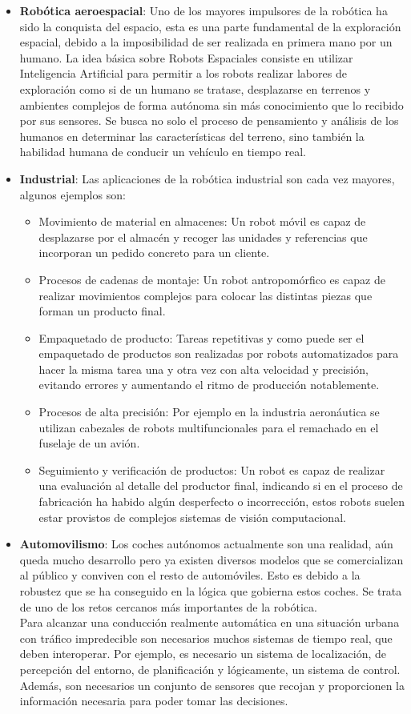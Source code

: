 \begin{itemize}
\item \textbf{Robótica aeroespacial}: Uno de los mayores impulsores de la robótica ha sido la conquista del espacio, esta es una parte fundamental de la exploración espacial, debido a la imposibilidad de ser realizada en primera mano por un humano.
La idea básica sobre Robots Espaciales consiste en utilizar Inteligencia Artificial para
permitir a los robots realizar labores de exploración como si de un humano se tratase, desplazarse en terrenos y ambientes complejos de forma autónoma sin más conocimiento que lo recibido por sus sensores. Se busca no solo el proceso de pensamiento y análisis de los humanos en determinar las características del terreno, sino también la habilidad humana de conducir un vehículo en tiempo real.
\item \textbf{Industrial}: Las aplicaciones de la robótica industrial son cada vez mayores, algunos ejemplos son:
\begin{itemize}
\item Movimiento de material en almacenes: Un robot móvil es capaz de desplazarse por el almacén y recoger las unidades y referencias que incorporan un pedido concreto para un cliente.
\item Procesos de cadenas de montaje: Un robot antropomórfico es capaz de realizar movimientos complejos para colocar las distintas piezas que forman un producto final.
\item Empaquetado de producto: Tareas repetitivas y como puede ser el empaquetado de productos son realizadas por robots automatizados para hacer la misma tarea una y otra vez con alta velocidad y precisión, evitando errores y aumentando el ritmo de producción notablemente.
\item Procesos de alta precisión: Por ejemplo en la industria aeronáutica se utilizan cabezales de robots multifuncionales para el remachado en el fuselaje de un avión.
\item Seguimiento y verificación de productos: Un robot es capaz de realizar una evaluación al detalle del productor final, indicando si en el proceso de fabricación ha habido algún desperfecto o incorrección, estos robots suelen estar provistos de complejos sistemas de visión computacional.
\end{itemize}

\item \textbf{Automovilismo}: Los coches autónomos actualmente son una realidad, aún queda mucho desarrollo pero ya existen diversos modelos que se comercializan al público y conviven con el resto de automóviles. Esto es debido a la robustez que se ha conseguido en la lógica que gobierna estos coches. Se trata de uno de los retos cercanos más importantes de la robótica.\\
Para alcanzar una conducción realmente automática en una situación urbana con tráfico impredecible son necesarios muchos sistemas de tiempo real, que deben interoperar. Por ejemplo, es necesario un sistema de localización, de percepción del entorno, de planificación y lógicamente, un sistema de control. Además, son necesarios un conjunto de sensores que recojan y proporcionen la información necesaria para poder tomar las decisiones.


\end{itemize}
